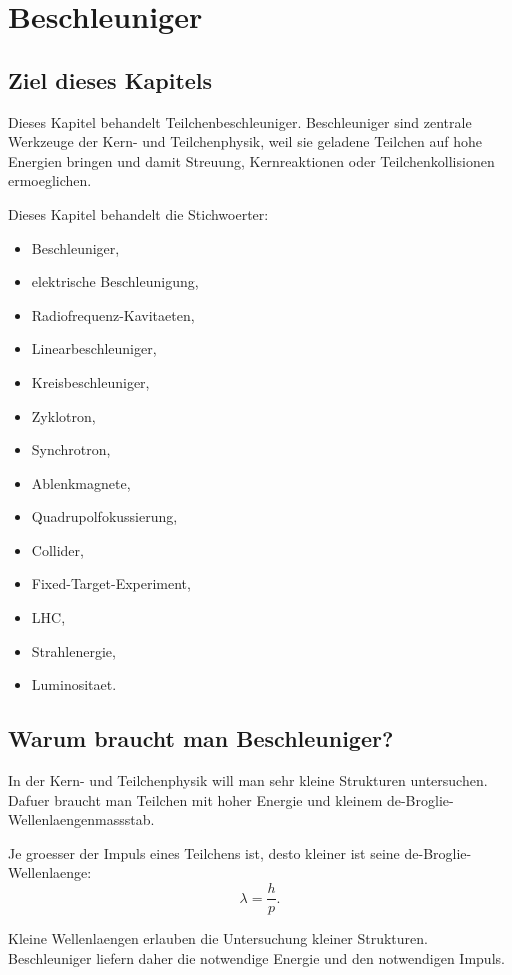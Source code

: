 \chapter{Beschleuniger}

\section{Ziel dieses Kapitels}

Dieses Kapitel behandelt Teilchenbeschleuniger.
Beschleuniger sind zentrale Werkzeuge der Kern- und Teilchenphysik, weil sie
geladene Teilchen auf hohe Energien bringen und damit Streuung, Kernreaktionen
oder Teilchenkollisionen ermoeglichen.

\begin{notebox}
Dieses Kapitel behandelt die Stichwoerter:
\begin{itemize}
    \item Beschleuniger,
    \item elektrische Beschleunigung,
    \item Radiofrequenz-Kavitaeten,
    \item Linearbeschleuniger,
    \item Kreisbeschleuniger,
    \item Zyklotron,
    \item Synchrotron,
    \item Ablenkmagnete,
    \item Quadrupolfokussierung,
    \item Collider,
    \item Fixed-Target-Experiment,
    \item LHC,
    \item Strahlenergie,
    \item Luminositaet.
\end{itemize}
\end{notebox}

\section{Warum braucht man Beschleuniger?}

In der Kern- und Teilchenphysik will man sehr kleine Strukturen untersuchen.
Dafuer braucht man Teilchen mit hoher Energie und kleinem de-Broglie-Wellenlaengenmassstab.

\begin{conceptbox}
Je groesser der Impuls eines Teilchens ist, desto kleiner ist seine de-Broglie-Wellenlaenge:
\[
    \lambda = \frac{h}{p}.
\]

Kleine Wellenlaengen erlauben die Untersuchung kleiner Strukturen.
Beschleuniger liefern daher die notwendige Energie und den notwendigen Impuls.
\end{conceptbox}

